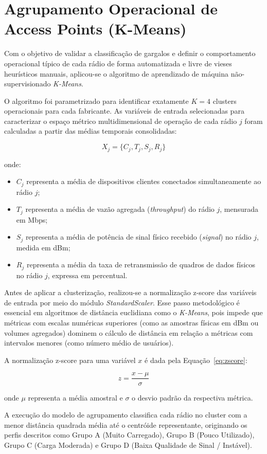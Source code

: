 \section{Agrupamento Operacional de Access Points (K-Means)}
\label{sec:kmeans_desenvolvimento}

Com o objetivo de validar a classificação de gargalos e definir o comportamento operacional típico de cada rádio de forma automatizada e livre de vieses heurísticos manuais, aplicou-se o algoritmo de aprendizado de máquina não-supervisionado \textit{K-Means}. 

O algoritmo foi parametrizado para identificar exatamente $K=4$ clusters operacionais para cada fabricante. As variáveis de entrada selecionadas para caracterizar o espaço métrico multidimensional de operação de cada rádio $j$ foram calculadas a partir das médias temporais consolidadas:

\begin{equation}
\label{eq:features_kmeans}
X_j = \{ C_j, T_j, S_j, R_j \}
\end{equation}

onde:
\begin{itemize}
	\item $C_j$ representa a média de dispositivos clientes conectados simultaneamente ao rádio $j$;
	\item $T_j$ representa a média de vazão agregada (\textit{throughput}) do rádio $j$, mensurada em Mbps;
	\item $S_j$ representa a média de potência de sinal físico recebido (\textit{signal}) no rádio $j$, medida em dBm;
	\item $R_j$ representa a média da taxa de retransmissão de quadros de dados físicos no rádio $j$, expressa em percentual.
\end{itemize}

Antes de aplicar a clusterização, realizou-se a normalização z-score das variáveis de entrada por meio do módulo \textit{StandardScaler}. Esse passo metodológico é essencial em algoritmos de distância euclidiana como o \textit{K-Means}, pois impede que métricas com escalas numéricas superiores (como as amostras físicas em dBm ou volumes agregados) dominem o cálculo de distância em relação a métricas com intervalos menores (como número médio de usuários).

A normalização z-score para uma variável $x$ é dada pela Equação~\ref{eq:zscore}:

\begin{equation}
\label{eq:zscore}
z = \frac{x - \mu}{\sigma}
\end{equation}

onde $\mu$ representa a média amostral e $\sigma$ o desvio padrão da respectiva métrica.

A execução do modelo de agrupamento classifica cada rádio no cluster com a menor distância quadrada média até o centróide representante, originando os perfis descritos como Grupo A (Muito Carregado), Grupo B (Pouco Utilizado), Grupo C (Carga Moderada) e Grupo D (Baixa Qualidade de Sinal / Instável).
